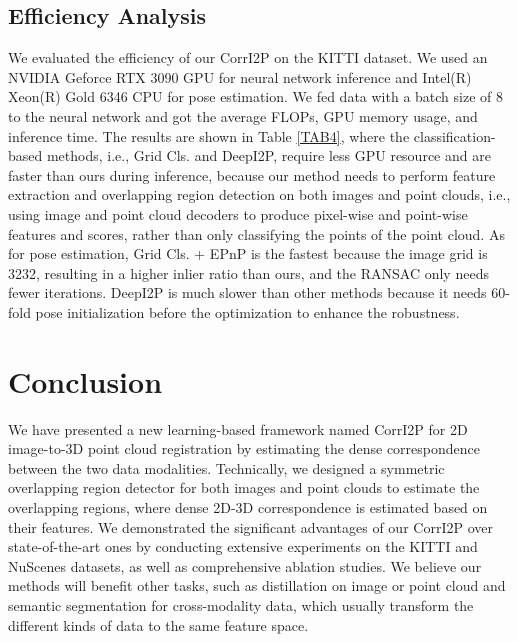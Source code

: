 \documentclass[lettersize,journal]{IEEEtran}
\begin{document}
\subsection{Efficiency Analysis}
We evaluated the efficiency of our CorrI2P on the KITTI dataset. We used an NVIDIA Geforce RTX 3090 GPU for neural network inference and Intel(R) Xeon(R) Gold 6346 CPU for pose estimation. We fed data with a batch size of 8 to the neural network and got the average FLOPs, GPU memory usage, and inference time. The results are shown in Table \ref{TAB4}, where the classification-based methods, i.e., Grid Cls. and DeepI2P, require less GPU resource and are faster than ours during inference, because our method needs to perform feature extraction and overlapping region detection on both images and point clouds, i.e., using image and point cloud decoders to produce pixel-wise and point-wise features and scores, rather than only classifying the points of the point cloud. As for pose estimation, Grid Cls. + EPnP is the fastest because the image grid is 3232, resulting in a higher inlier ratio than ours, and the RANSAC only needs fewer iterations. DeepI2P is much slower than other methods because it needs 60-fold pose initialization before the optimization to enhance the robustness.

\section{Conclusion}
\label{sec:con}
We have presented a new learning-based framework named CorrI2P for 2D image-to-3D point cloud registration by estimating the dense correspondence between the two data modalities. Technically,  
we designed a symmetric overlapping region detector for both images and point clouds to estimate the overlapping regions, where dense 2D-3D correspondence is estimated based on their features. We demonstrated the significant advantages of our CorrI2P over state-of-the-art ones by conducting extensive experiments on the KITTI and NuScenes datasets, as well as comprehensive ablation studies. We believe our methods will benefit other tasks, such as distillation on image or point cloud and semantic segmentation for cross-modality data, which usually transform the different kinds of data to the same feature space.





\end{document}
